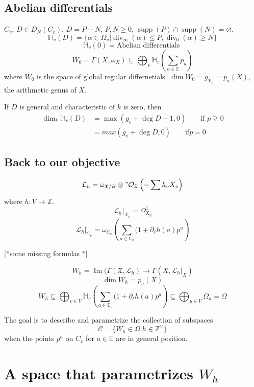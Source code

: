 \subsection{Abelian differentials}
$C_v$,  $D\in D_N(C_v)$, $D=P-N$,  $P,N\geq 0$, $\operatorname{supp}(P)\cap \operatorname{supp}(N)=\varnothing$.
\[\mathbb{H}_v(D)=\{\alpha\in\Omega_v|\operatorname{div}_\infty(\alpha)\leq P,\operatorname{div}_0(\alpha)\geq N\}\]
\[\mathbb{H}_v\left(0 \right) =\text{Abelian differentials } \]
\[W_0=\Gamma(X,\omega_X)\subseteq \bigoplus_{v} \mathbb{H}_v\left( \sum_{a\in\mathbb{E}}p_a \right)  \]
where $W_0$ is the space of global regular differnetials. $\dim W_0=g_{\mathfrak{X}_\eta}=p_a(X)$, the arithmetic genus of $X$.

If $D$ is general and characteristic of  $k$ is zero, then 
\begin{align*}\dim_k \mathbb{H}_v(D)&=\max(g_v+\operatorname{deg}D-1,0)\qquad \text{if }p\gneq 0\\
&=max(g_v+\operatorname{deg}D,0)\qquad \text{if} p=0\end{align*}

\subsection{Back to our objective}

\[\mathcal{L}_{h}=\omega_{\mathfrak{X} /B}\otimes"\mathcal{O}_{\mathfrak{X} }\left( -\sum h_vX_v \right) \]
where $h:V\longrightarrow \mathbb{Z}$.
\[\mathcal{L}_{h}|_{X_\eta}=\Omega^1_{\mathfrak{X}_\eta}\]
\[\mathcal{L}_{h}|_{C_v}=\omega_{C_v}\left( \sum_{a\in\mathbb{E}_{v}} (1+\partial_{\ell}h(a)p^a \right) \]

[$*$some missing formulas $*$]

\[W_h=\operatorname{Im}(\Gamma(\mathfrak{X},\mathcal{L}_{h})\longrightarrow \Gamma(X,\mathcal{L}_{h}|_{X})\]
\[\dim W_h=p_a(X)\]
\[W_h\subseteq \bigoplus_{v\in V}\mathbb{H}_v\left( \sum_{a\in\mathbb{E}_v}(1+\partial_\ell h(a)p^a \right) \subseteq \bigoplus_{u\in V}\Omega_u    =\Omega\]

\begin{idea2}{The goal}\leavevmode
	is to describe and parametrize the collection of subspaces
	\[\mathcal{C}=\{W_h\in\Omega|h\in\mathbb{Z}^\vee\}\]
	when the points $p^a$ on  $C_v$ for  $a \in  \mathbb{E}$ are in general position.
\end{idea2}

\section{A space that parametrizes $W_h$}

